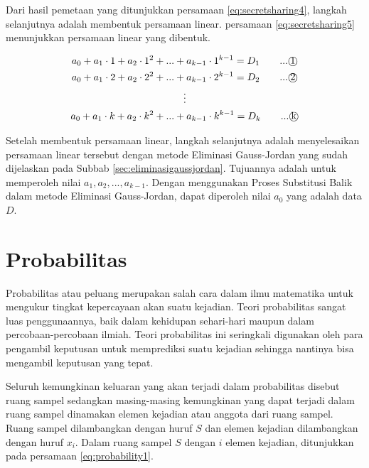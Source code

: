 Dari hasil pemetaan yang ditunjukkan persamaan \ref{eq:secretsharing4}, langkah selanjutnya adalah membentuk persamaan linear. persamaan \ref{eq:secretsharing5} menunjukkan persamaan linear yang dibentuk.

\begin{gather}
	a_0 + a_1\cdot 1 + a_2\cdot 1^2 + ... + a_{k-1}\cdot 1^{k-1} = D_1 \qquad...\text{\textcircled{1}} \nonumber \\
	a_0 + a_1\cdot 2 + a_2\cdot 2^2 + ... + a_{k-1}\cdot 2^{k-1} = D_2 \qquad...\text{\textcircled{2}} \nonumber \\
	\vdots \nonumber \\
	a_0 + a_1\cdot k + a_2\cdot k^2 + ... + a_{k-1}\cdot k^{k-1} = D_k \qquad...\text{\textcircled{k}} \label{eq:secretsharing5}
\end{gather}

Setelah membentuk persamaan linear, langkah selanjutnya adalah menyelesaikan persamaan linear tersebut dengan metode Eliminasi Gauss-Jordan yang sudah dijelaskan pada Subbab \ref{sec:eliminasigaussjordan}. Tujuannya adalah untuk memperoleh nilai \begin{math}a_1, a_2, ..., a_{k-1}\end{math}. Dengan menggunakan Proses Substitusi Balik dalam metode Eliminasi Gauss-Jordan, dapat diperoleh nilai \begin{math}a_0\end{math} yang adalah data \begin{math}D\end{math}.

\section{Probabilitas}
Probabilitas atau peluang merupakan salah cara dalam ilmu matematika untuk mengukur tingkat kepercayaan akan suatu kejadian. Teori probabilitas sangat luas penggunaannya, baik dalam kehidupan sehari-hari maupun dalam percobaan-percobaan ilmiah. Teori probabilitas ini seringkali digunakan oleh para pengambil keputusan untuk memprediksi suatu kejadian sehingga nantinya bisa mengambil keputusan yang tepat.

Seluruh kemungkinan keluaran yang akan terjadi dalam probabilitas disebut ruang sampel sedangkan masing-masing kemungkinan yang dapat terjadi dalam ruang sampel dinamakan elemen kejadian atau anggota dari ruang sampel. Ruang sampel dilambangkan dengan huruf \begin{math}S\end{math} dan elemen kejadian dilambangkan dengan huruf \begin{math}x_i\end{math}. Dalam ruang sampel \begin{math}S\end{math} dengan \begin{math}i\end{math} elemen kejadian, ditunjukkan pada persamaan \ref{eq:probability1}.

